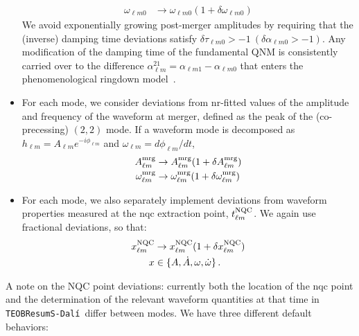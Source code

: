 \documentclass[prd,amssymb,amsmath,amsfonts,nofootinbib,reprint,showpacs,longbibliography]{revtex4-1}
\def\TEOBResumSDali{\texttt{TEOBResumS-Dalí}}
\def\alphalm0{\alpha_{\ell m 0}}
\def\taulm0{\tau_{\ell m 0}}
\def\omegalm0{\omega_{\ell m 0}}
\begin{document}
\begin{itemize}
\begin{subequations}
\begin{align}
\omegalm0 &\rightarrow \omegalm0 (1 + \delta \omegalm0)
\end{align}
\end{subequations}
We avoid exponentially growing post-merger amplitudes by requiring that the (inverse) damping time
deviations satisfy $\delta \taulm0 > -1\  (\delta \alphalm0 > -1)$. Any modification of the damping time
of the fundamental QNM is consistently carried over to the difference $\alpha_{\ell m}^{21} = 
\alpha_{\ell m 1} - \alphalm0$ that enters the phenomenological ringdown model~\cite{Damour:2014sva,
Nagar:2019wds,Nagar:2019pcj}.
%
\item For each mode, we consider deviations from \ac{nr}-fitted values of the amplitude and frequency of the
waveform at merger, defined as the peak of the (co-precessing) $(2,2)$ mode. If a waveform mode is decomposed
as $h_{\ell m} = A_{\ell m} e^{-i \phi_{\ell m}}$ and $\omega_{\ell m} = d\phi_{\ell m}/dt$,
\begin{subequations}
\begin{align}
A_{\ell m}^{\rm mrg} &\rightarrow A_{\ell m}^{\rm mrg} (1 + \delta A_{\ell m}^{\rm mrg}) \\
\omega_{\ell m}^{\rm mrg} &\rightarrow \omega_{\ell m}^{\rm mrg} (1 + \delta \omega_{\ell m}^{\rm mrg})
\end{align}
\end{subequations}
%
\item For each mode, we also separately implement deviations from waveform properties measured at the \ac{nqc}
extraction point, $t_{\ell m}^{\rm NQC}$. We again use fractional deviations, so that:
\begin{subequations}
\begin{align}
x_{\ell m}^{\rm NQC} &\rightarrow x_{\ell m}^{\rm NQC} (1 + \delta x_{\ell m}^{\rm NQC}) \\
x &\in \{A, \dot{A}, \omega, \dot{\omega}\} \, .
\end{align}
\end{subequations}
\end{itemize}
%
A note on the NQC point deviations: currently both the location of the \ac{nqc} point and the determination
of the relevant waveform quantities at that time in \TEOBResumSDali~differ between modes.
We have three different default behaviors:
\end{document}

